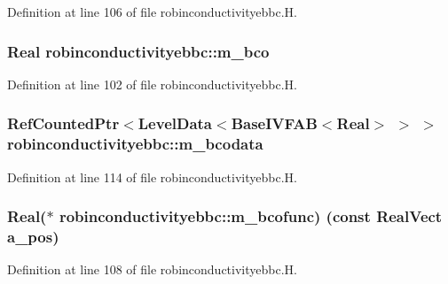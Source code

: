 Definition at line 106 of file robinconductivityebbc.\+H.

\subsubsection[{\texorpdfstring{m\+\_\+bco}{m_bco}}]{\setlength{\rightskip}{0pt plus 5cm}Real robinconductivityebbc\+::m\+\_\+bco\hspace{0.3cm}{\ttfamily [protected]}}\hypertarget{classrobinconductivityebbc_a18d83321dafb63690393cb1a20f8441d}{}\label{classrobinconductivityebbc_a18d83321dafb63690393cb1a20f8441d}


Definition at line 102 of file robinconductivityebbc.\+H.

\subsubsection[{\texorpdfstring{m\+\_\+bcodata}{m_bcodata}}]{\setlength{\rightskip}{0pt plus 5cm}Ref\+Counted\+Ptr$<$Level\+Data$<$Base\+I\+V\+F\+AB$<$Real$>$ $>$ $>$ robinconductivityebbc\+::m\+\_\+bcodata\hspace{0.3cm}{\ttfamily [protected]}}\hypertarget{classrobinconductivityebbc_aec962607d910fd59f69708624f3bf23c}{}\label{classrobinconductivityebbc_aec962607d910fd59f69708624f3bf23c}


Definition at line 114 of file robinconductivityebbc.\+H.

\subsubsection[{\texorpdfstring{m\+\_\+bcofunc}{m_bcofunc}}]{\setlength{\rightskip}{0pt plus 5cm}Real($\ast$ robinconductivityebbc\+::m\+\_\+bcofunc) (const Real\+Vect a\+\_\+pos)\hspace{0.3cm}{\ttfamily [protected]}}\hypertarget{classrobinconductivityebbc_a565052f51d8a07a73d09bac5dd63b2d6}{}\label{classrobinconductivityebbc_a565052f51d8a07a73d09bac5dd63b2d6}


Definition at line 108 of file robinconductivityebbc.\+H.

